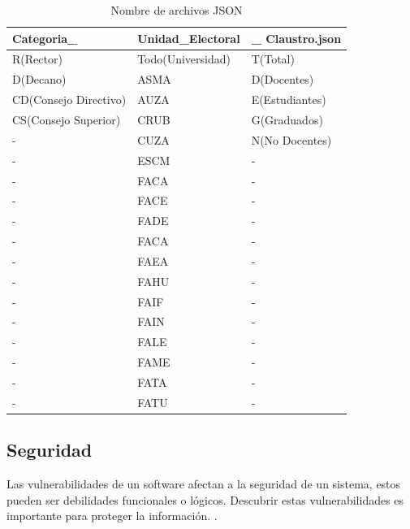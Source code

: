 \begin{table}[htbp]
\begin{center}
\begin{tabular}{|l|l|l|}
\hline
Categoria\_ & Unidad\_Electoral & \_ Claustro.json\\
\hline \hline 
R(Rector) & Todo(Universidad) & T(Total)\\ \hline
D(Decano) & ASMA & D(Docentes)\\ \hline
CD(Consejo Directivo) & AUZA & E(Estudiantes)\\ \hline
CS(Consejo Superior) & CRUB & G(Graduados)\\ \hline
-& CUZA & N(No Docentes) \\ \hline
-& ESCM &- \\ \hline
-& FACA &- \\ \hline
-& FACE &- \\ \hline
-& FADE &- \\ \hline
-& FACA &- \\ \hline
-& FAEA &- \\ \hline
-& FAHU &- \\ \hline
-& FAIF &- \\ \hline
-& FAIN &- \\ \hline
-& FALE &- \\ \hline
-& FAME &- \\ \hline
-& FATA &- \\ \hline
-& FATU &- \\ \hline
\end{tabular}
\end{center}
\caption{Nombre de archivos JSON}
\label{tab:formatoJSON}
\end{table}

\subsection{Seguridad}
Las vulnerabilidades de un software afectan a la seguridad de un sistema, estos pueden ser debilidades funcionales o lógicos.
Descubrir estas vulnerabilidades es importante para proteger la información. \cite{definicionVulnerabilidad}.

